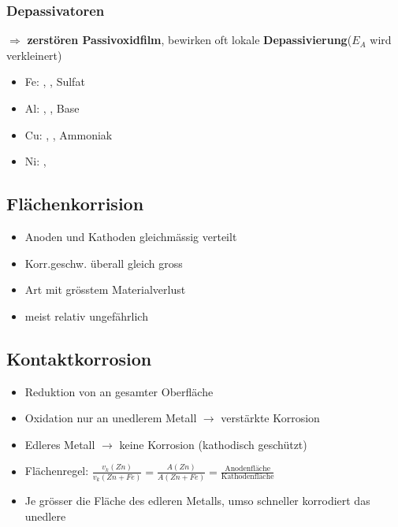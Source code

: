     \subsubsection{Depassivatoren}
        $\Rightarrow$ \textbf{zerstören Passivoxidfilm}, bewirken oft lokale \textbf{Depassivierung}($E_A$ wird verkleinert)
        \begin{itemize}
            \item Fe: \color{blue} \color{black}, \color{red} \color{black}, Sulfat 
            \item Al: \color{blue} \color{black}, \color{red} \color{black}, Base 
            \item Cu: \color{blue} \color{black}, \color{red} \color{black}, Ammoniak 
            \item Ni: \color{blue} \color{black}, \color{red} \color{black}
        \end{itemize}
    

\subsection{Flächenkorrision}
    \begin{itemize}
        \item Anoden und Kathoden gleichmässig verteilt
        \item Korr.geschw. überall gleich gross
        \item Art mit grösstem Materialverlust
        \item meist relativ ungefährlich
    \end{itemize}

\subsection{Kontaktkorrosion}
    \begin{itemize}
        \item Reduktion von  an gesamter Oberfläche
        \item Oxidation nur an unedlerem Metall $\rightarrow$ verstärkte Korrosion
        \item Edleres Metall $\rightarrow$ keine Korrosion (kathodisch geschützt)
        \item Flächenregel: $\frac{v_k(Zn)}{v_k(Zn + Fe)} = \frac{A(Zn)}{A(Zn + Fe)} = \frac{\text{Anodenfläche}}{\text{Kathodenfläche}}$ 
        \item[] Je grösser die Fläche des edleren Metalls, umso schneller korrodiert das unedlere
    \end{itemize}

